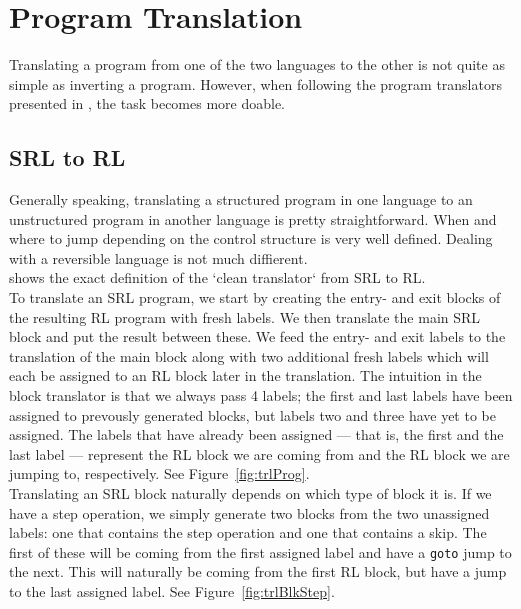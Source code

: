 \section{Program Translation}
Translating a program from one of the two languages to the other is not quite as simple as inverting a program. However, when following the program translators presented in \cite{REV}, the task becomes more doable.

\subsection{SRL to RL}

Generally speaking, translating a structured program in one language to an unstructured program in another language is pretty straightforward. When and where to jump depending on the control structure is very well defined. Dealing with a reversible language is not much diffierent.\\

\noindent \cite[Fig.~21]{REV} shows the exact definition of the `clean translator` from SRL to RL.\\

\noindent To translate an SRL program, we start by creating the entry- and exit blocks of the resulting RL program with fresh labels. We then translate the main SRL block and put the result between these. We feed the entry- and exit labels to the translation of the main block along with two additional fresh labels which will each be assigned to an RL block later in the translation. The intuition in the block translator is that we always pass 4 labels; the first and last labels have been assigned to prevously generated blocks, but labels two and three have yet to be assigned. The labels that have already been assigned --- that is, the first and the last label --- represent the RL block we are coming from and the RL block we are jumping to, respectively. See Figure~\ref{fig:trlProg}.\\

\noindent Translating an SRL block naturally depends on which type of block it is. If we have a step operation, we simply generate two blocks from the two unassigned labels: one that contains the step operation and one that contains a skip. The first of these will be coming from the first assigned label and have a \texttt{goto} jump to the next. This will naturally be coming from the first RL block, but have a jump to the last assigned label. See Figure~\ref{fig:trlBlkStep}.\\

